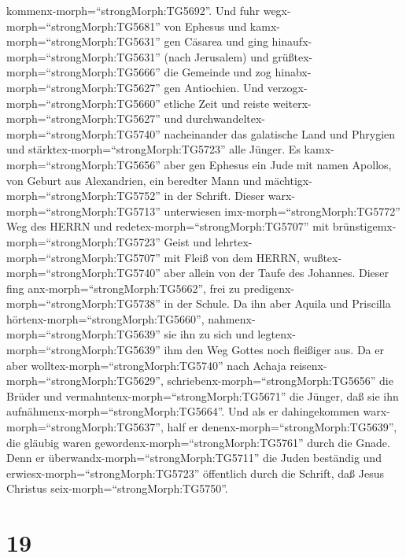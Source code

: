 kommenx-morph=``strongMorph:TG5692''. Und fuhr
wegx-morph=``strongMorph:TG5681'' von Ephesus  und
kamx-morph=``strongMorph:TG5631'' gen Cäsarea und ging
hinaufx-morph=``strongMorph:TG5631'' (nach Jerusalem) und
grüßtex-morph=``strongMorph:TG5666'' die Gemeinde und zog
hinabx-morph=``strongMorph:TG5627'' gen Antiochien.  Und
verzogx-morph=``strongMorph:TG5660'' etliche Zeit und reiste
weiterx-morph=``strongMorph:TG5627'' und
durchwandeltex-morph=``strongMorph:TG5740'' nacheinander das galatische
Land und Phrygien und stärktex-morph=``strongMorph:TG5723'' alle Jünger.
 Es kamx-morph=``strongMorph:TG5656'' aber gen Ephesus ein
Jude mit namen Apollos, von Geburt aus Alexandrien, ein beredter Mann
und mächtigx-morph=``strongMorph:TG5752'' in der Schrift. 
Dieser warx-morph=``strongMorph:TG5713'' unterwiesen
imx-morph=``strongMorph:TG5772'' Weg des HERRN und
redetex-morph=``strongMorph:TG5707'' mit
brünstigemx-morph=``strongMorph:TG5723'' Geist und
lehrtex-morph=``strongMorph:TG5707'' mit Fleiß von dem HERRN,
wußtex-morph=``strongMorph:TG5740'' aber allein von der Taufe des
Johannes.  Dieser fing anx-morph=``strongMorph:TG5662'',
frei zu predigenx-morph=``strongMorph:TG5738'' in der Schule. Da ihn
aber Aquila und Priscilla hörtenx-morph=``strongMorph:TG5660'',
nahmenx-morph=``strongMorph:TG5639'' sie ihn zu sich und
legtenx-morph=``strongMorph:TG5639'' ihm den Weg Gottes noch fleißiger
aus.  Da er aber wolltex-morph=``strongMorph:TG5740'' nach
Achaja reisenx-morph=``strongMorph:TG5629'',
schriebenx-morph=``strongMorph:TG5656'' die Brüder und
vermahntenx-morph=``strongMorph:TG5671'' die Jünger, daß sie ihn
aufnähmenx-morph=``strongMorph:TG5664''. Und als er dahingekommen
warx-morph=``strongMorph:TG5637'', half er
denenx-morph=``strongMorph:TG5639'', die gläubig waren
gewordenx-morph=``strongMorph:TG5761'' durch die Gnade. 
Denn er überwandx-morph=``strongMorph:TG5711'' die Juden beständig und
erwiesx-morph=``strongMorph:TG5723'' öffentlich durch die Schrift, daß
Jesus Christus seix-morph=``strongMorph:TG5750''.

\hypertarget{section-18}{%
\section{19}\label{section-18}}

